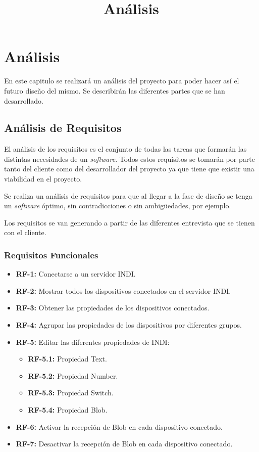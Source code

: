 \chapter{Análisis}
\title{Análisis}
\label{cap:Analisis}

En este capitulo se realizará un análisis del proyecto para poder hacer así el futuro diseño del mismo.
Se describirán las diferentes partes que se han desarrollado.

\section{Análisis de Requisitos}
El análisis de los requisitos es el conjunto de todas las tareas que formarán las distintas necesidades de un \textit{software}. Todos estos requisitos se tomarán por parte tanto del cliente como del desarrollador del proyecto ya que tiene que existir una viabilidad en el proyecto.

Se realiza un análisis de requisitos para que al llegar a la fase de diseño se tenga un \textit{software} óptimo, sin contradicciones o sin ambigüedades, por ejemplo.

Los requisitos se van generando a partir de las diferentes entrevista que se tienen con el cliente.

\subsection{Requisitos Funcionales}
\begin{itemize}
  \item \textbf{RF-1:} Conectarse a un servidor INDI.
  \item \textbf{RF-2:} Mostrar todos los dispositivos conectados en el servidor INDI.
  \item \textbf{RF-3:} Obtener las propiedades de los dispositivos conectados.
  \item \textbf{RF-4:} Agrupar las propiedades de los dispositivos por diferentes grupos.
  \item \textbf{RF-5:} Editar las diferentes propiedades de INDI:
  \begin{itemize}
    \item \textbf{RF-5.1:} Propiedad Text.
    \item \textbf{RF-5.2:} Propiedad Number.
    \item \textbf{RF-5.3:} Propiedad Switch.
    \item \textbf{RF-5.4:} Propiedad Blob.
  \end{itemize}
  \item \textbf{RF-6:} Activar la recepción de Blob en cada dispositivo conectado.
  \item \textbf{RF-7:} Desactivar la recepción de Blob en cada dispositivo conectado.
\end{itemize}

